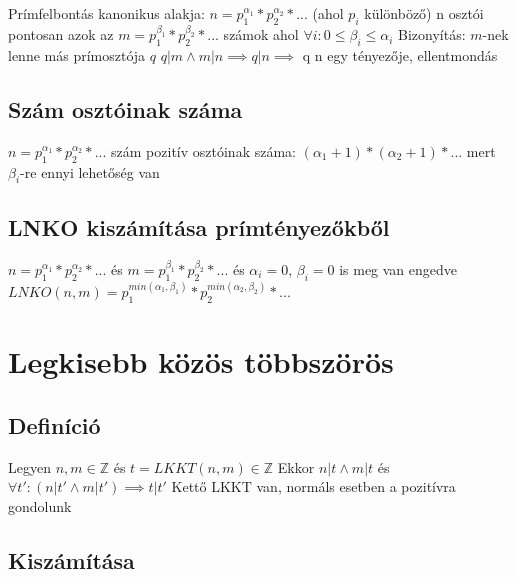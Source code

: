 \documentclass[12pt,a4paper]{article}
\begin{document}
\begin{outline}
	\1 Prímfelbontás kanonikus alakja: $n=p_1^{\alpha_1}*p_2^{\alpha_2}*...$ (ahol $p_i$ különböző)
	\1 n osztói pontosan azok az $m=p_1^{\beta_1}*p_2^{\beta_2}*...$
	számok ahol $\forall i: 0 \le \beta_i \le \alpha_i$
	\1 Bizonyítás:
		\2 $m$-nek lenne más prímosztója $q$
		\2 $q|m \wedge m|n \implies q|n \implies$ q n egy tényezője, ellentmondás
\end{outline}

\subsection{Szám osztóinak száma}

\begin{outline}
	\1 $n=p_1^{\alpha_1}*p_2^{\alpha_2}*...$ szám pozitív osztóinak száma:
	$(\alpha_1+1)*(\alpha_2+1)*...$
	\1 mert $\beta_i$-re ennyi lehetőség van
\end{outline}

\subsection{LNKO kiszámítása prímtényezőkből}

\begin{outline}
	\1 $n=p_1^{\alpha_1}*p_2^{\alpha_2}*...$ és $m=p_1^{\beta_1}*p_2^{\beta_2}*...$
	és $\alpha_i=0$, $\beta_i=0$ is meg van engedve
	\1 $LNKO(n,m)=p_1^{min(\alpha_1,\beta_1)}*p_2^{min(\alpha_2,\beta_2)}*...$
\end{outline}

\pagebreak

\section{Legkisebb közös többszörös}

\subsection{Definíció}

\begin{outline}
	\1 Legyen $n,m \in \mathbb{Z}$ és $t=LKKT(n,m) \in \mathbb{Z}$
	\1 Ekkor $n|t \wedge m|t$ és $\forall t': (n|t' \wedge m|t') \implies t|t'$
	\1 Kettő LKKT van, normáls esetben a pozitívra gondolunk
\end{outline}

\subsection{Kiszámítása}
\end{document}

